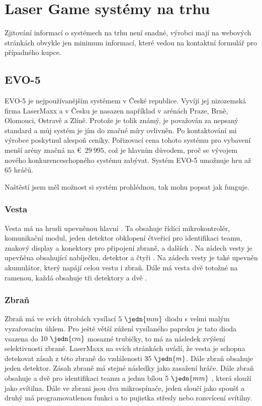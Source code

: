 \section{Laser Game systémy na trhu}
Zjitování informací o systémech na trhu není snadné, výrobci mají na webových stránkách obvykle jen minimum informací, které vedou na kontaktní formulář pro případného kupce.

\subsection{EVO-5}

EVO-5 je nejpoužívanějším  systémem v České republice. Vyvíjí jej nizozemská firma LaserMaxx a v Česku je nasazen například v arénách Praze, Brně, Olomouci, Ostravě a Zlíně. Protože je tolik známý, je považován za nepsaný standard a můj systém je jím do značné míry ovlivněn. Po kontaktování mi výrobce poskytnul alespoň ceníky. Pořizovací cena tohoto systému pro vybavení menší arény značná na €~$29~995$, což je hlavním důvodem, proč se vývojem nového konkurenceschopného systému zabývat. Systém EVO-5 umožnuje hru až 65 hráčů.

Naštěstí jsem měl možnost si systém prohlédnou, tak mohu popsat jak funguje.

\subsubsection{Vesta}
Vesta má na hrudi upevněnou hlavní . Ta obsahuje řídící mikrokontrolér, komunikační  modul, jeden  detektor obklopení čtveřicí   pro identifikaci teamu, znakový display a konektory pro připojení zbraně, a dalších . Na zádech vesty je upevňěna  obsahující nabíječku,  detektor a čtyři  . Na zádech vesty je také upevněn akumulátor, který napájí celou vestu i zbraň. Dále má vesta dvě totožné  na ramenou, každá obsahuje tři  detektory a dvě  .

\subsubsection{Zbraň}
Zbraň má ve svích útrobách vysílací $5~\jedn{mm}$   diodu s velmi malým vyzařovacím úhlem. Pro ještě větší zúžení vysílaného paprsku je tato dioda vsazena do $10~\jedn{cm}$ mosazné trubičky, to má za následek zvýšení selektivnosti zbraně. LaserMaxx na svích stránkách uvádí, že vesta je schopna detekovat zásah z této zbraně do vzdálenosti $35~\jedn{m}$. Dále zbraň obsahuje jeden  detektor. Zásah zbraně má stejné následky jako zasažení hráče. Dále zbraň obsahuje a dvě   pro identifikaci teamu a jednu bílou $5~\jedn{mm}$ , která slouží jako svítilna. Dále ve zbrani jsou dva mikrospínače, jeden sloučí jako spoušť a druhý má programovatlenou funkci a to pujistka střesly nebo rozsvícení svítilny.

